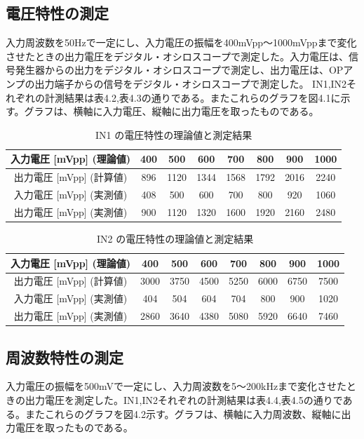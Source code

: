 \documentclass{jlreq}
\numberwithin{equation}{section}
\begin{document}
\subsection{電圧特性の測定}
入力周波数を50Hzで一定にし、入力電圧の振幅を400mVpp〜1000mVppまで変化させたときの出力電圧をデジタル・オシロスコープで測定した。入力電圧は、信号発生器からの出力をデジタル・オシロスコープで測定し、出力電圧は、OPアンプの出力端子からの信号をデジタル・オシロスコープで測定した。
IN1,IN2それぞれの計測結果は表4.2,表4.3の通りである。またこれらのグラフを図4.1に示す。グラフは、横軸に入力電圧、縦軸に出力電圧を取ったものである。
\begin{table}[H]
  \centering
  \caption{IN1 の電圧特性の理論値と測定結果}
  \begin{tabular}{|c|c|c|c|c|c|c|c|}
    \hline
    入力電圧 [mVpp] (理論値) & 400 & 500 & 600 & 700 & 800 & 900 & 1000 \\ \hline
    出力電圧 [mVpp] (計算値) & 896& 1120 & 1344 & 1568 & 1792 & 2016 & 2240 \\ \hline
    入力電圧 [mVpp] (実測値) & 408 & 500 & 600 & 700 & 800 & 920 & 1060 \\ \hline
    出力電圧 [mVpp] (実測値) & 900 & 1120 & 1320 & 1600 & 1920 & 2160 & 2480 \\ \hline
  \end{tabular}
\end{table}

\begin{table}[H]
  \centering
  \caption{IN2 の電圧特性の理論値と測定結果}
  \begin{tabular}{|c|c|c|c|c|c|c|c|}
    \hline
    入力電圧 [mVpp] (理論値) & 400 & 500 & 600 & 700 & 800 & 900 & 1000 \\ \hline
    出力電圧 [mVpp] (計算値) & 3000 & 3750 & 4500 & 5250 & 6000 & 6750 & 7500 \\ \hline
    入力電圧 [mVpp] (実測値) & 404 & 504 & 604 & 704 & 800 & 900 & 1020 \\ \hline
    出力電圧 [mVpp] (実測値) & 2860 & 3640 & 4380 & 5080 & 5920 & 6640 & 7460 \\ \hline
  \end{tabular}
\end{table}

\subsection{周波数特性の測定}
入力電圧の振幅を500mVで一定にし、入力周波数を5〜200kHzまで変化させたときの出力電圧を測定した。IN1,IN2それぞれの計測結果は表4.4,表4.5の通りである。またこれらのグラフを図4.2示す。グラフは、横軸に入力周波数、縦軸に出力電圧を取ったものである。
\end{document}
